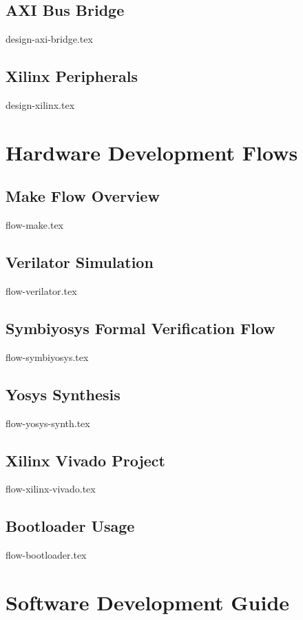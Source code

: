 \documentclass{scarv-report}
\begin{document}
\subsection{AXI Bus Bridge}
{design-axi-bridge.tex}

\subsection{Xilinx Peripherals}
{design-xilinx.tex}

\section{Hardware Development Flows}
\label{sec:hw-flows}

\subsection{Make Flow Overview}
{flow-make.tex}

\subsection{Verilator Simulation}
{flow-verilator.tex}

\subsection{Symbiyosys Formal Verification Flow}
{flow-symbiyosys.tex}

\subsection{Yosys Synthesis}
{flow-yosys-synth.tex}

\subsection{Xilinx Vivado Project}
{flow-xilinx-vivado.tex}

\subsection{Bootloader Usage}
{flow-bootloader.tex}

\section{Software Development Guide}
\label{sec:sw-development}
\end{document}
